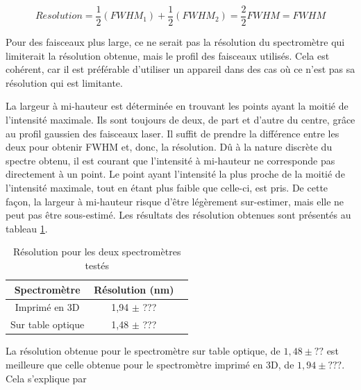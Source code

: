 \documentclass[11pt,letterpaper]{article}
\begin{document}
\begin{equation}\label{res}
  Resolution = \frac{1}{2}(FWHM_1)+\frac{1}{2}(FWHM_2)=\frac{2}{2}FWHM=FWHM
\end{equation}

Pour des faisceaux plus large, ce ne serait pas la 
résolution du spectromètre qui limiterait la résolution obtenue, mais le profil des faisceaux
utilisés. Cela est cohérent, car il est préférable d'utiliser un appareil dans des cas où 
ce n'est pas sa résolution qui est limitante. 

La largeur à mi-hauteur est déterminée en trouvant les points ayant la moitié de l'intensité 
maximale. Ils sont toujours de deux, de part et d'autre du centre, grâce au profil gaussien
des faisceaux laser. Il suffit de prendre la différence entre les deux pour obtenir FWHM et,
donc, la résolution. Dû à la nature discrète du spectre obtenu, il est courant que l'intensité à 
mi-hauteur ne corresponde pas directement à un point. Le point ayant l'intensité la plus proche
de la moitié de l'intensité maximale, tout en étant plus faible que celle-ci, est pris. De
cette façon, la largeur à mi-hauteur risque d'être légèrement sur-estimer, mais elle ne peut pas
être sous-estimé. Les résultats des résolution obtenues sont présentés au tableau \ref{res_tab}.

\begin{table}[H]
  \centering
  \begin{tabular}{|c|c|c|}\hline
    Spectromètre & Résolution (nm) \\
    \hline
    Imprimé en 3D & 1,94 $\pm$ ???\\    \hline
    Sur table optique & 1,48 $\pm$ ???\\    \hline
  \end{tabular}
  \caption{Résolution pour les deux spectromètres testés}
  \label{res_tab}
\end{table}

La résolution obtenue pour le spectromètre sur table optique, de $1,48 \pm ??$ est meilleure que celle 
obtenue pour le spectromètre imprimé en 3D, de $1,94 \pm ???$. Cela s'explique par 

\end{document}
